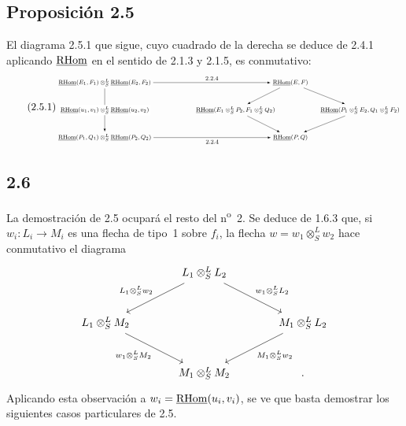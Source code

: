 \subsection*{Proposición 2.5}
El diagrama 2.5.1 que sigue, cuyo cuadrado de la derecha se deduce de 2.4.1 aplicando $\underline{\mathrm{RHom}}$ en el sentido de 2.1.3 y 2.1.5, es conmutativo:
\begin{equation}\tag{2.5.1}
\resizebox{0.98\textwidth}{!}{%
\begin{tikzpicture}[>=latex,baseline=(current bounding box.center)]
\footnotesize
\node (A) at (0,2.6) {$\uRHom(E_1,F_1)\otimes^L_S\uRHom(E_2,F_2)$};
\node (C) at (0,0) {$\uRHom(P_1,Q_1)\otimes^L_S\uRHom(P_2,Q_2)$};
\node (D) at (8.8,2.6) {$\uRHom(E,F)$};
\node (E) at (6.2,1.3) {$\uRHom(E_1\otimes^L_SP_2,F_1\otimes^L_SQ_2)$};
\node (F) at (12.1,1.3) {$\uRHom(P_1\otimes^L_SE_2,Q_1\otimes^L_SF_2)$};
\node (G) at (8.8,0) {$\uRHom(P,Q)$};
\draw[->] (A) -- node[above] {$2.2.4$} (D);
\draw[->] (A) -- node[midway,fill=white,inner sep=2pt] {$\uRHom(u_1,v_1)\otimes^L_S\uRHom(u_2,v_2)$} (C);
\draw[->] (C) -- node[below] {$2.2.4$} (G);
\draw[->] (D) -- (E);
\draw[->] (D) -- (F);
\draw[->] (E) -- (G);
\draw[->] (F) -- (G);
\end{tikzpicture}}
\end{equation}

\subsection*{2.6}
La demostración de 2.5 ocupará el resto del n\textsuperscript{o}~2. Se deduce de 1.6.3 que, si $w_i:L_i\to M_i$ es una flecha de tipo~1 sobre $f_i$, la flecha $w=w_1\otimes^{L}_{S}w_2$ hace conmutativo el diagrama
\[
\begin{tikzcd}[column sep=large,row sep=large]
& L_1\otimes^L_S L_2 \arrow[dl,"{L_1\otimes^L_S w_2}"'] \arrow[dr,"{w_1\otimes^L_S L_2}"] & \\
L_1\otimes^L_S M_2 \arrow[dr,"{w_1\otimes^L_S M_2}"'] & & M_1\otimes^L_S L_2 \arrow[dl,"{M_1\otimes^L_S w_2}"]\\
& M_1\otimes^L_S M_2 & .
\end{tikzcd}
\]
Aplicando esta observación a $w_i=\underline{\mathrm{RHom}}(u_i,v_i)$, se ve que basta demostrar los siguientes casos particulares de 2.5.

